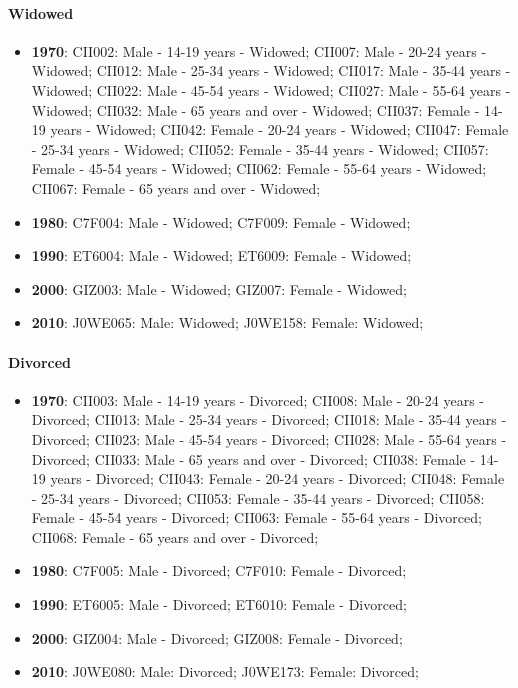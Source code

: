 \documentclass[a4paper]{article}
\begin{document}
\paragraph{Widowed}
\begin{itemize}
   \item{\textbf{1970}:  CII002: Male - 14-19 years - Widowed; CII007: Male - 20-24 years - Widowed; CII012: Male - 25-34 years - Widowed; CII017: Male - 35-44 years - Widowed; CII022: Male - 45-54 years - Widowed; CII027: Male - 55-64 years - Widowed; CII032: Male - 65 years and over - Widowed; CII037: Female - 14-19 years - Widowed; CII042: Female - 20-24 years - Widowed; CII047: Female - 25-34 years - Widowed; CII052: Female - 35-44 years - Widowed; CII057: Female - 45-54 years - Widowed; CII062: Female - 55-64 years - Widowed; CII067: Female - 65 years and over - Widowed;}
   \item{\textbf{1980}:  C7F004: Male - Widowed; C7F009: Female - Widowed;}
   \item{\textbf{1990}:  ET6004: Male - Widowed; ET6009: Female - Widowed;}
   \item{\textbf{2000}:  GIZ003: Male - Widowed; GIZ007: Female - Widowed;}
   \item{\textbf{2010}:  J0WE065: Male: Widowed; J0WE158: Female: Widowed;}
\end{itemize}

\paragraph{Divorced}
\begin{itemize}
   \item{\textbf{1970}:  CII003: Male - 14-19 years - Divorced; CII008: Male - 20-24 years - Divorced; CII013: Male - 25-34 years - Divorced; CII018: Male - 35-44 years - Divorced; CII023: Male - 45-54 years - Divorced; CII028: Male - 55-64 years - Divorced; CII033: Male - 65 years and over - Divorced; CII038: Female - 14-19 years - Divorced; CII043: Female - 20-24 years - Divorced; CII048: Female - 25-34 years - Divorced; CII053: Female - 35-44 years - Divorced; CII058: Female - 45-54 years - Divorced; CII063: Female - 55-64 years - Divorced; CII068: Female - 65 years and over - Divorced;}
   \item{\textbf{1980}:  C7F005: Male - Divorced; C7F010: Female - Divorced;}
   \item{\textbf{1990}:  ET6005: Male - Divorced; ET6010: Female - Divorced;}
   \item{\textbf{2000}:  GIZ004: Male - Divorced; GIZ008: Female - Divorced;}
   \item{\textbf{2010}:  J0WE080: Male: Divorced; J0WE173: Female: Divorced;}
\end{itemize}
\end{document}

